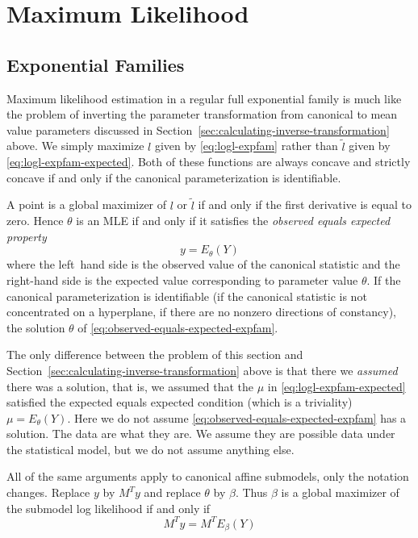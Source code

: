 \section{Maximum Likelihood}

\subsection{Exponential Families}

Maximum likelihood estimation in a regular full exponential family is
much like the problem of inverting the parameter transformation from
canonical to mean value parameters discussed in
Section~\ref{sec:calculating-inverse-transformation} above.
We simply maximize $l$ given by \eqref{eq:logl-expfam} rather than
$\tilde{l}$ given by \eqref{eq:logl-expfam-expected}.
Both of these functions are always concave and strictly concave if and
only if the canonical parameterization is identifiable.

A point is a global maximizer of $l$ or $\tilde{l}$ if and only if the first
derivative is equal to zero.  Hence $\theta$ is an MLE
if and only if it satisfies the \emph{observed equals expected property}
\begin{equation} \label{eq:observed-equals-expected-expfam}
   y = E_\theta(Y)
\end{equation}
where the left~hand side is the observed value of the canonical statistic
and the right-hand side is the expected value corresponding to parameter
value $\theta$.  If the canonical parameterization is identifiable (if the
canonical statistic is not concentrated on a hyperplane, if there are no
nonzero directions of constancy), the solution $\theta$
of \eqref{eq:observed-equals-expected-expfam}.

The only difference between the problem of this section and
Section~\ref{sec:calculating-inverse-transformation} above is that
there we \emph{assumed} there was a solution, that is, we assumed
that the $\mu$ in \eqref{eq:logl-expfam-expected} satisfied the
expected equals expected condition (which is a triviality) $\mu = E_\theta(Y)$.
Here we do not assume \eqref{eq:observed-equals-expected-expfam} has a solution.
The data are what they are.  We assume they are possible data under the
statistical model, but we do not assume anything else.

All of the same arguments apply to canonical affine submodels,
only the notation changes.  Replace $y$ by $M^T y$ and replace $\theta$ by
$\beta$.  Thus $\beta$ is a global maximizer of the submodel log likelihood
if and only if
\begin{equation} \label{eq:observed-equals-expected-expfam-submodel}
   M^T y = M^T E_\beta(Y)
\end{equation}

